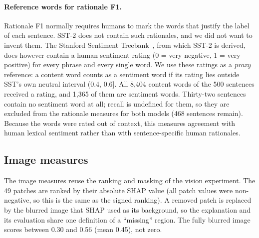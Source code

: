 \documentclass[11pt,a4paper]{article}
\begin{document}
\paragraph{Reference words for rationale F1.} Rationale F1 normally requires humans to
mark the words that justify the label of each sentence. SST-2 does not contain such
rationales, and we did not want to invent them. The Stanford Sentiment
Treebank~\cite{socher2013}, from which SST-2 is derived, does however contain a human
sentiment rating (0 = very negative, 1 = very positive) for every phrase and every single
word. We use these ratings as a \emph{proxy} reference: a content word counts as a
sentiment word if its rating lies outside SST's own neutral interval (0.4, 0.6]. All 8,404
content words of the 500 sentences received a rating, and 1,365 of them are sentiment
words. Thirty-two sentences contain no sentiment word at all; recall is undefined for them,
so they are excluded from the rationale measures for both models (468 sentences remain).
Because the words were rated out of context, this measures agreement with human lexical
sentiment rather than with sentence-specific human rationales.

\subsection{Image measures}\label{sec:vision-metrics}

The image measures reuse the ranking and masking of the vision experiment. The 49 patches
are ranked by their absolute SHAP value (all patch values were non-negative, so this is
the same as the signed ranking). A removed patch is replaced by the blurred image that
SHAP used as its background, so the explanation and its evaluation share one definition
of a ``missing'' region. The fully blurred image scores between 0.30 and 0.56 (mean 0.45),
not zero.
\end{document}
